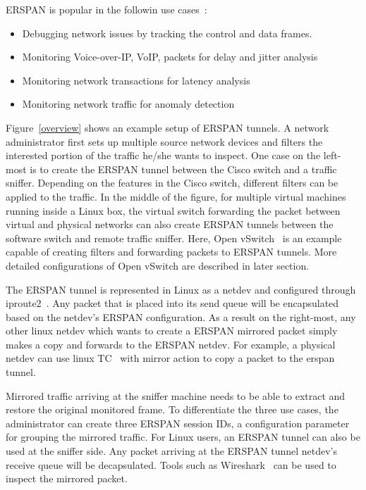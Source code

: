 \documentclass[10pt]{sigplanconf}
\begin{document}
ERSPAN is popular in the followin use cases~\cite{erspan_ietf}:
\begin{itemize}
\item Debugging network issues by tracking the control and data frames. 
\item Monitoring Voice-over-IP, VoIP, packets for delay and jitter analysis
\item Monitoring network transactions for latency analysis
\item Monitoring network traffic for anomaly detection
\end{itemize}
Figure~\ref{overview} shows an example setup of ERSPAN tunnels.
A network administrator first sets up multiple source network devices
and filters the interested portion of the traffic he/she wants
to inspect.  One case on the left-most is to create the ERSPAN tunnel
between the Cisco switch and a traffic sniffer.  Depending on the
features in the Cisco switch, different filters can be applied to the
traffic.  In the middle of the figure, for multiple virtual machines running
inside a Linux box, the virtual switch forwarding the packet between
virtual and physical networks can also create ERSPAN tunnels between
the software switch and remote traffic sniffer.
Here, Open vSwitch~\cite{ovs} is an example capable of creating filters
and forwarding packets to ERSPAN tunnels. More detailed configurations of
Open vSwitch are described in later section. 

The ERSPAN tunnel is represented in Linux as a netdev and configured
through iproute2~\cite{iproute2}. Any packet that is placed into its send
queue will be encapsulated based on the netdev's ERSPAN configuration.  
As a result on the right-most, any other linux netdev which wants to create
a ERSPAN mirrored packet simply makes a copy and forwards to the ERSPAN netdev.
For example, a physical netdev can use linux TC~\cite{tcsubsys} with mirror
action to copy a packet to the erspan tunnel.

Mirrored traffic arriving at the sniffer machine needs to be able to
extract and restore the original monitored frame.  To differentiate
the three use cases, the administrator can create three ERSPAN session
IDs, a configuration parameter for grouping the mirrored traffic.
For Linux users, an ERSPAN tunnel can also be used at the sniffer side.
Any packet arriving at the ERSPAN tunnel netdev's receive queue will
be decapsulated. Tools such as Wireshark~\cite{wireshark_erspan,wireshark_erspan2}
can be used to inspect the mirrored packet.
\end{document}
